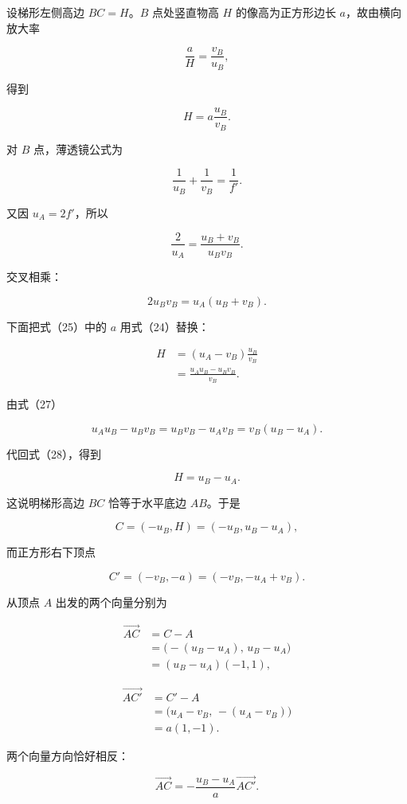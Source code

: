 \documentclass[12pt,a4paper,UTF8]{ctexart}
\begin{document}
设梯形左侧高边 \(BC=H\)。\(B\) 点处竖直物高 \(H\) 的像高为正方形边长
\(a\)，故由横向放大率

\[
\frac aH=\frac{v_B}{u_B},
\]

得到

\[
H=a\frac{u_B}{v_B}.
\tag{25}
\]

对 \(B\) 点，薄透镜公式为

\[
\frac1{u_B}+\frac1{v_B}=\frac1{f'}.
\tag{26}
\]

又因 \(u_A=2f'\)，所以

\[
\frac2{u_A}
=\frac{u_B+v_B}{u_Bv_B}.
\]

交叉相乘：

\[
2u_Bv_B=u_A(u_B+v_B).
\tag{27}
\]

下面把式（25）中的 \(a\) 用式（24）替换：

\[
\begin{aligned}
H
&=(u_A-v_B)\frac{u_B}{v_B}\\
&=\frac{u_Au_B-u_Bv_B}{v_B}.
\end{aligned}
\tag{28}
\]

由式（27）

\[
u_Au_B-u_Bv_B
=u_Bv_B-u_Av_B
=v_B(u_B-u_A).
\]

代回式（28），得到

\[
\boxed{H=u_B-u_A}.
\tag{29}
\]

这说明梯形高边 \(BC\) 恰等于水平底边 \(AB\)。于是

\[
C=(-u_B,H)
=(-u_B,u_B-u_A),
\tag{30}
\]

而正方形右下顶点

\[
C'=(-v_B,-a)
=(-v_B,-u_A+v_B).
\tag{31}
\]

从顶点 \(A\) 出发的两个向量分别为

\[
\begin{aligned}
\overrightarrow{AC}
&=C-A\\
&=\bigl(-(u_B-u_A),\,u_B-u_A\bigr)\\
&=(u_B-u_A)(-1,1),
\end{aligned}
\tag{32}
\]

\[
\begin{aligned}
\overrightarrow{AC'}
&=C'-A\\
&=\bigl(u_A-v_B,\,-(u_A-v_B)\bigr)\\
&=a(1,-1).
\end{aligned}
\tag{33}
\]

两个向量方向恰好相反：

\[
\overrightarrow{AC}
=-\frac{u_B-u_A}{a}\overrightarrow{AC'}.
\tag{34}
\]
\end{document}
